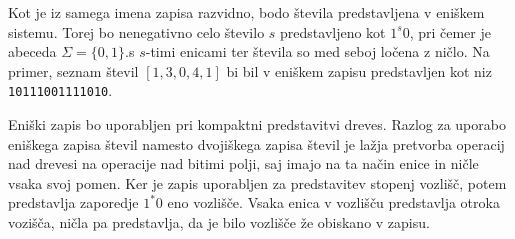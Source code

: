 Kot je iz samega imena zapisa razvidno, bodo števila predstavljena v eniškem sistemu. Torej bo nenegativno celo število $s$ predstavljeno kot $1^s0$, pri čemer je abeceda $\Sigma=\{0,1\}$.s $s$-timi enicami ter števila so med seboj ločena z ničlo. Na primer, seznam števil $[1,3,0,4,1]$ bi bil v eniškem zapisu predstavljen kot niz \texttt{10111001111010}.

Eniški zapis bo uporabljen pri kompaktni predstavitvi dreves. Razlog za uporabo eniškega zapisa števil namesto dvojiškega zapisa števil je lažja pretvorba operacij nad drevesi na operacije nad bitimi polji, saj imajo na ta način enice in ničle vsaka svoj pomen. Ker je zapis uporabljen za predstavitev stopenj vozlišč, potem predstavlja zaporedje $1^*0$ eno vozlišče. Vsaka enica v vozlišču predstavlja otroka vozišča, ničla pa predstavlja, da je bilo vozlišče že obiskano v zapisu.

